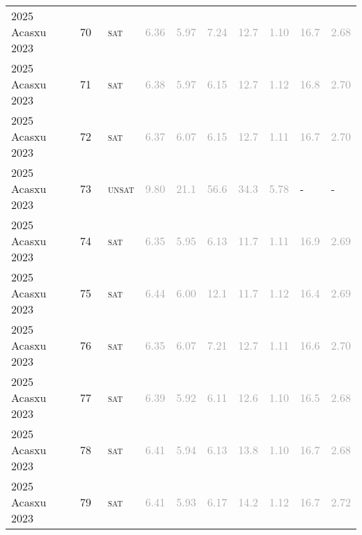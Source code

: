 \begin{center}
{\begin{longtable}{@{}llllllllll@{}}
2025 Acasxu 2023 & 70 & ~\textsc{sat} & \textcolor{darkgray}{6.36} & \textcolor{darkgray}{5.97} & \textcolor{darkgray}{7.24} & \textcolor{darkgray}{12.7} & \textcolor{darkgray}{1.10} & \textcolor{darkgray}{16.7} & \textcolor{darkgray}{2.68} \\
2025 Acasxu 2023 & 71 & ~\textsc{sat} & \textcolor{darkgray}{6.38} & \textcolor{darkgray}{5.97} & \textcolor{darkgray}{6.15} & \textcolor{darkgray}{12.7} & \textcolor{darkgray}{1.12} & \textcolor{darkgray}{16.8} & \textcolor{darkgray}{2.70} \\
2025 Acasxu 2023 & 72 & ~\textsc{sat} & \textcolor{darkgray}{6.37} & \textcolor{darkgray}{6.07} & \textcolor{darkgray}{6.15} & \textcolor{darkgray}{12.7} & \textcolor{darkgray}{1.11} & \textcolor{darkgray}{16.7} & \textcolor{darkgray}{2.70} \\
2025 Acasxu 2023 & 73 & ~\textsc{unsat} & \textcolor{darkgray}{9.80} & \textcolor{darkgray}{21.1} & \textcolor{darkgray}{56.6} & \textcolor{darkgray}{34.3} & \textcolor{darkgray}{5.78} & - & - \\
2025 Acasxu 2023 & 74 & ~\textsc{sat} & \textcolor{darkgray}{6.35} & \textcolor{darkgray}{5.95} & \textcolor{darkgray}{6.13} & \textcolor{darkgray}{11.7} & \textcolor{darkgray}{1.11} & \textcolor{darkgray}{16.9} & \textcolor{darkgray}{2.69} \\
2025 Acasxu 2023 & 75 & ~\textsc{sat} & \textcolor{darkgray}{6.44} & \textcolor{darkgray}{6.00} & \textcolor{darkgray}{12.1} & \textcolor{darkgray}{11.7} & \textcolor{darkgray}{1.12} & \textcolor{darkgray}{16.4} & \textcolor{darkgray}{2.69} \\
2025 Acasxu 2023 & 76 & ~\textsc{sat} & \textcolor{darkgray}{6.35} & \textcolor{darkgray}{6.07} & \textcolor{darkgray}{7.21} & \textcolor{darkgray}{12.7} & \textcolor{darkgray}{1.11} & \textcolor{darkgray}{16.6} & \textcolor{darkgray}{2.70} \\
2025 Acasxu 2023 & 77 & ~\textsc{sat} & \textcolor{darkgray}{6.39} & \textcolor{darkgray}{5.92} & \textcolor{darkgray}{6.11} & \textcolor{darkgray}{12.6} & \textcolor{darkgray}{1.10} & \textcolor{darkgray}{16.5} & \textcolor{darkgray}{2.68} \\
2025 Acasxu 2023 & 78 & ~\textsc{sat} & \textcolor{darkgray}{6.41} & \textcolor{darkgray}{5.94} & \textcolor{darkgray}{6.13} & \textcolor{darkgray}{13.8} & \textcolor{darkgray}{1.10} & \textcolor{darkgray}{16.7} & \textcolor{darkgray}{2.68} \\
2025 Acasxu 2023 & 79 & ~\textsc{sat} & \textcolor{darkgray}{6.41} & \textcolor{darkgray}{5.93} & \textcolor{darkgray}{6.17} & \textcolor{darkgray}{14.2} & \textcolor{darkgray}{1.12} & \textcolor{darkgray}{16.7} & \textcolor{darkgray}{2.72} \\

\end{longtable}}
\end{center}
